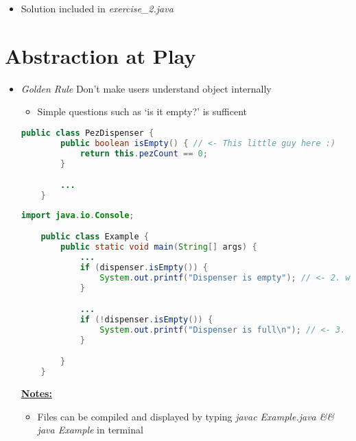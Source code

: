 \documentclass[12pt]{article}
\begin{document}
\bigskip

\begin{itemize}
    \item Solution included in \textit{exercise\_2.java}
\end{itemize}

\bigskip

\section{Abstraction at Play}

\bigskip

\begin{itemize}
    \item \textit{Golden Rule} Don't make users understand object internally
    \begin{itemize}
        \item Simple questions such as `is it empty?' is sufficent
    \end{itemize}

    \begin{lstlisting}[language=Java,caption={lesson\_5/PezDispenser.java}]
    public class PezDispenser {
        public boolean isEmpty() { // <- This little guy here :)
            return this.pezCount == 0;
        }

        ...
    }
    \end{lstlisting}

    \begin{lstlisting}[language=Java,caption={lesson\_5/Example.java}]
    import java.io.Console;

    public class Example {
        public static void main(String[] args) {
            ...
            if (dispenser.isEmpty()) {
                System.out.printf("Dispenser is empty"); // <- 2. with this little fellow here
            }

            ...
            if (!dispenser.isEmpty()) {
                System.out.printf("Dispenser is full\n"); // <- 3. and this guy as well
            }

        }
    }
    \end{lstlisting}

    \bigskip

    \underline{\textbf{Notes:}}

    \bigskip

    \begin{itemize}
        \item Files can be compiled and displayed by typing \textit{javac Example.java \&\& java Example}
        in terminal
    \end{itemize}

\end{itemize}
\end{document}
